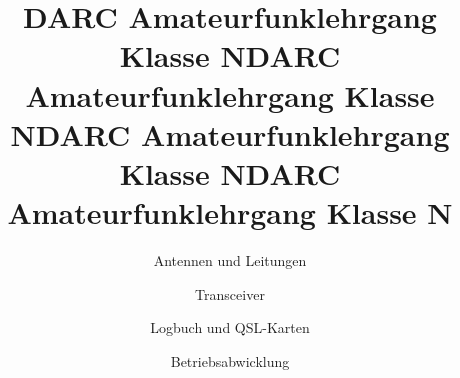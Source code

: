 \documentclass[aspectratio = 169]{beamer}
\begin{document}
\title{DARC Amateurfunklehrgang Klasse N}
\author{Antennen und Leitungen}
\begin{frame}
\maketitle
\end{frame}
























\title{DARC Amateurfunklehrgang Klasse N}
\author{Transceiver}
\begin{frame}
\maketitle
\end{frame}












\title{DARC Amateurfunklehrgang Klasse N}
\author{Logbuch und QSL-Karten}
\begin{frame}
\maketitle
\end{frame}



\title{DARC Amateurfunklehrgang Klasse N}
\author{Betriebsabwicklung}
\begin{frame}
\maketitle
\end{frame}






\end{document}
